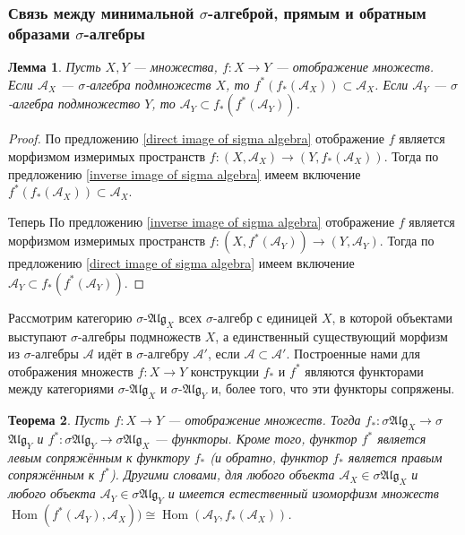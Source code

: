 \documentclass[12pt]{article}
\newtheorem{theorem}{Теорема}
\newtheorem{lemma}[theorem]{Лемма}
\numberwithin{theorem}{section}
\theoremstyle{definition}
\newcommand{\calA}{\mathcal{A}}
\newcommand{\Hom}{\operatorname{Hom}}
\begin{document}
	\subsubsection{Связь между минимальной $ \sigma $-алгеброй, прямым и обратным образами $ \sigma $-алгебры}
	
	\begin{lemma} \label{inclusions direct-inverse}
		Пусть $ X, Y $ --- множества, $ f \colon X \to Y $ --- отображение множеств.
		Если $ \calA_X $ --- $ \sigma $-алгебра подмножеств $ X $, то $ f^*(f_*(\calA_X)) \subset  \calA_X $.
		Если $ \calA_Y $ --- $ \sigma $-алгебра подмножество $ Y $, то $ \calA_Y \subset f_*(f^*(\calA_Y)) $.
	\end{lemma}
	
	\begin{proof}
		По предложению \ref{direct image of sigma algebra} отображение $ f $ является
		морфизмом измеримых пространств $ f \colon (X, \calA_X) \to (Y, f_*(\calA_X)) $.
		Тогда по предложению \ref{inverse image of sigma algebra} имеем включение
		$ f^*(f_*(\calA_X)) \subset  \calA_X $.
		
		Теперь По предложению \ref{inverse image of sigma algebra} отображение $ f $ является
		морфизмом измеримых пространств $ f \colon (X, f^*(\calA_Y)) \to (Y, \calA_Y) $.
		Тогда по предложению \ref{direct image of sigma algebra} имеем включение
		$ \calA_Y \subset f_*(f^*(\calA_Y)) $.
	\end{proof}
	
	Рассмотрим категорию $ \sigma $-$ \mathfrak{Alg}_X $ всех $ \sigma $-алгебр с единицей $ X $,
	в которой объектами выступают $ \sigma $-алгебры подмножеств $ X $,
	а единственный существующий морфизм из $ \sigma $-алгебры $ \calA $ идёт в $ \sigma $-алгебру $ \calA' $,
	если $ \calA \subset \calA' $. Построенные нами для отображения множеств $ f \colon X \to Y $
	конструкции $ f_* $ и $ f^* $ являются функторами между категориями $ \sigma $-$ \mathfrak{Alg}_X $
	и $ \sigma $-$ \mathfrak{Alg}_Y $ и, более того, что эти функторы сопряжены.
	
	\begin{theorem}
		Пусть $ f \colon X \to Y $ --- отображение множеств.
		Тогда $ f_* \colon \sigma $\text{-}$ \mathfrak{Alg}_X \to \sigma $\text{-}$ \mathfrak{Alg}_Y $
		и $ f^* \colon \sigma $\text{-}$ \mathfrak{Alg}_Y \to \sigma $\text{-}$ \mathfrak{Alg}_X $
		--- функторы.
		Кроме того, функтор $ f^* $ является левым сопряжённым к функтору $ f_* $ 
		(и обратно, функтор $ f_* $ является правым сопряжённым к $ f^* $). 
		Другими словами, для любого объекта $ \calA_X \in \sigma $\text{-}$ \mathfrak{Alg}_X $
		и любого объекта $ \calA_Y \in \sigma $\text{-}$ \mathfrak{Alg}_Y $ и имеется естественный изоморфизм
		множеств $ \Hom(f^*(\calA_Y), \calA_X)) \cong \Hom(\calA_Y, f_*(\calA_X)) $.
	\end{theorem}
	
\end{document}
